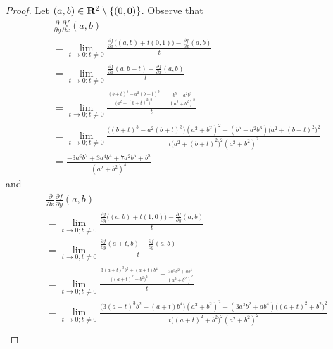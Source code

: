 \begin{proof}
    Let \((a, b) \in \mathbf{R}^2 \setminus \{(0, 0)\}\).
    Observe that
    \begin{align*}
         & \frac{\partial}{\partial y} \frac{\partial f}{\partial x}(a, b)                                                                                                                 \\
         & = \lim_{t \to 0 ; t \neq 0} \frac{\frac{\partial f}{\partial x}\big((a, b) + t(0, 1)\big) - \frac{\partial f}{\partial x}(a, b)}{t}                                             \\
         & = \lim_{t \to 0 ; t \neq 0} \frac{\frac{\partial f}{\partial x}(a, b + t) - \frac{\partial f}{\partial x}(a, b)}{t}                                                             \\
         & = \lim_{t \to 0 ; t \neq 0} \frac{\frac{(b + t)^5 - a^2 (b + t)^3}{\big(a^2 + (b + t)^2\big)^2} - \frac{b^5 - a^2 b^3}{(a^2 + b^2)^2}}{t}                                       \\
         & = \lim_{t \to 0 ; t \neq 0} \frac{\big((b + t)^5 - a^2 (b + t)^3\big) (a^2 + b^2)^2 - (b^5 - a^2 b^3) \big(a^2 + (b + t)^2\big)^2}{t \big(a^2 + (b + t)^2\big)^2 (a^2 + b^2)^2} \\
         & = \frac{-3 a^6 b^2 + 3 a^4 b^4 + 7 a^2 b^6 + b^8}{(a^2 + b^2)^4}
    \end{align*}
    and
    \begin{align*}
         & \frac{\partial}{\partial x} \frac{\partial f}{\partial y}(a, b)                                                                                                                         \\
         & = \lim_{t \to 0 ; t \neq 0} \frac{\frac{\partial f}{\partial y}\big((a, b) + t(1, 0)\big) - \frac{\partial f}{\partial y}(a, b)}{t}                                                     \\
         & = \lim_{t \to 0 ; t \neq 0} \frac{\frac{\partial f}{\partial y}(a + t, b) - \frac{\partial f}{\partial y}(a, b)}{t}                                                                     \\
         & = \lim_{t \to 0 ; t \neq 0} \frac{\frac{3 (a + t)^3 b^2 + (a + t) b^4}{\big((a + t)^2 + b^2\big)^2} - \frac{3 a^3 b^2 + a b^4}{(a^2 + b^2)^2}}{t}                                       \\
         & = \lim_{t \to 0 ; t \neq 0} \frac{\big(3 (a + t)^3 b^2 + (a + t) b^4\big) (a^2 + b^2)^2 - (3 a^3 b^2 + a b^4) \big((a + t)^2 + b^2\big)^2}{t \big((a + t)^2 + b^2\big)^2 (a^2 + b^2)^2} \\

\end{align*}
\end{proof}
